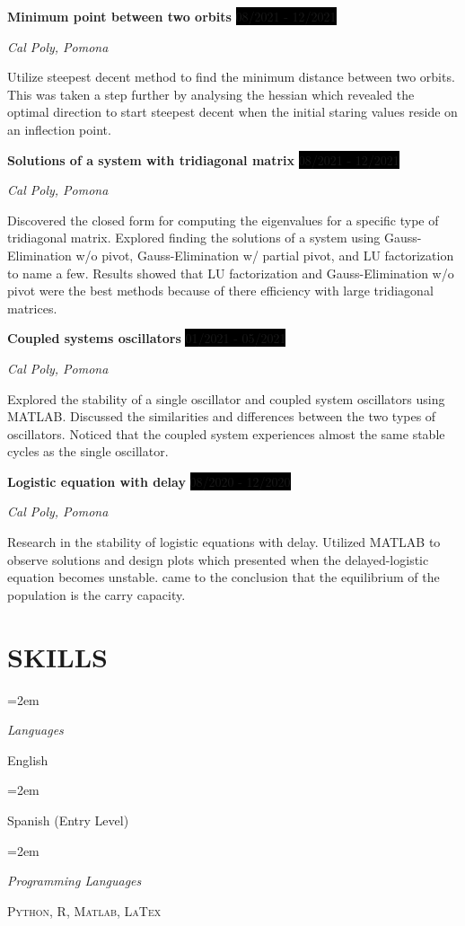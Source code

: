 \documentclass[paper=a4,fontsize=10pt]{scrartcl} %
\newlength{\spacebox}
\newcommand{\sepspace}{\vspace*{1em}}		%
\newcommand{\NewPart}[1]{\section*{\uppercase{#1}}}
\newcommand{\PersonalEntry}[2]{
		\noindent\hangindent=2em\hangafter=0 %
		\parbox{\spacebox}{        %
		\textit{#1}}		       %
		\hspace{1.5em} #2 \par}    %
\newcommand{\SkillsEntry}[2]{      %
		\noindent\hangindent=2em\hangafter=0 %
		\parbox{\spacebox}{        %
		\textit{#1}}			   %
		\hspace{1.5em} #2 \par}    %
\newcommand{\EducationEntry}[4]{
		\noindent \textbf{#1} \hfill      %
		\colorbox{Black}{%
			\parbox{5em}{%
			\hfill\color{White}#2}} \par  %
		\noindent \textit{#3} \par        %
		\noindent\hangindent=2em\hangafter=0 \small #4 %
		\normalsize \par}
\newcommand{\WorkEntry}[4]{				  %
		\noindent \textbf{#1} \hfill      %
		\colorbox{Black}{\color{White}#2} \par  %
		\noindent \textit{#3} \par              %
		\noindent \small #4 %
		\normalsize}
\begin{document}
\sepspace
\newpage
\WorkEntry{Minimum point between two orbits}
{08/2021 - 12/2021}
{Cal Poly, Pomona}
{Utilize steepest decent method to find the minimum distance between two orbits.
This was taken a step further by analysing the hessian which revealed the optimal direction to start steepest decent when the initial staring values reside on an inflection point.
}
\sepspace

\WorkEntry{Solutions of a system with tridiagonal matrix}
{08/2021 - 12/2021}
{Cal Poly, Pomona}
{Discovered the closed form for computing the eigenvalues for a specific type of tridiagonal
matrix. Explored finding the solutions of a system using Gauss-Elimination w/o pivot, Gauss-Elimination w/ partial pivot, and LU factorization to name a few. Results showed that LU factorization and Gauss-Elimination w/o pivot were the best methods because of there efficiency with large tridiagonal matrices.}

\sepspace

\WorkEntry{Coupled systems oscillators}
{01/2021 - 05/2021}
{Cal Poly, Pomona}
{Explored the stability of a single oscillator and coupled system oscillators using MATLAB. Discussed the similarities and differences between the two types of oscillators. Noticed that the coupled system experiences almost
the same stable cycles as the single oscillator.}

\sepspace

\WorkEntry{Logistic equation with delay}
{08/2020 - 12/2020}
{Cal Poly, Pomona}
{Research in the stability of logistic equations with delay. 
Utilized MATLAB to observe solutions and design plots which presented when the delayed-logistic equation becomes unstable. came to the conclusion that the equilibrium
of the population is the carry capacity.}
\sepspace





\NewPart{Skills}{}

\SkillsEntry{Languages}{English}
\SkillsEntry{}{Spanish (Entry Level)}
\sepspace

\SkillsEntry{Programming Languages}{ \textsc{Python}, \textsc{R}, \textsc{Matlab}, \textsc{LaTex} }
\end{document}
